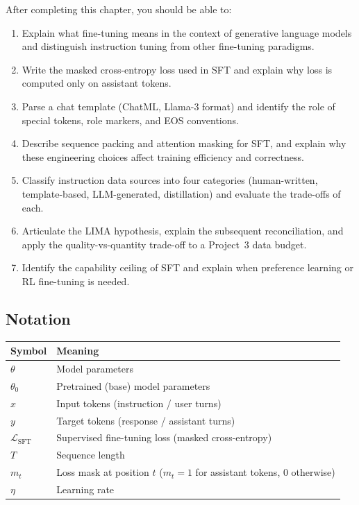 After completing this chapter, you should be able to:

\begin{enumerate}
  \item Explain what fine-tuning means in the context of generative language models and distinguish instruction tuning from other fine-tuning paradigms.
  \item Write the masked cross-entropy loss used in SFT and explain why loss is computed only on assistant tokens.
  \item Parse a chat template (ChatML, Llama-3 format) and identify the role of special tokens, role markers, and EOS conventions.
  \item Describe sequence packing and attention masking for SFT, and explain why these engineering choices affect training efficiency and correctness.
  \item Classify instruction data sources into four categories (human-written, template-based, LLM-generated, distillation) and evaluate the trade-offs of each.
  \item Articulate the LIMA hypothesis, explain the subsequent reconciliation, and apply the quality-vs-quantity trade-off to a Project~3 data budget.
  \item Identify the capability ceiling of SFT and explain when preference learning or RL fine-tuning is needed.
\end{enumerate}


\subsection*{Notation}

\begin{center}
\begin{tabular}{ll}
\toprule
Symbol & Meaning \\
\midrule
$\theta$ & Model parameters \\
$\theta_0$ & Pretrained (base) model parameters \\
$x$ & Input tokens (instruction / user turns) \\
$y$ & Target tokens (response / assistant turns) \\
$\mathcal{L}_{\text{SFT}}$ & Supervised fine-tuning loss (masked cross-entropy) \\
$T$ & Sequence length \\
$m_t$ & Loss mask at position $t$ ($m_t = 1$ for assistant tokens, $0$ otherwise) \\
$\eta$ & Learning rate \\
\bottomrule
\end{tabular}
\end{center}


